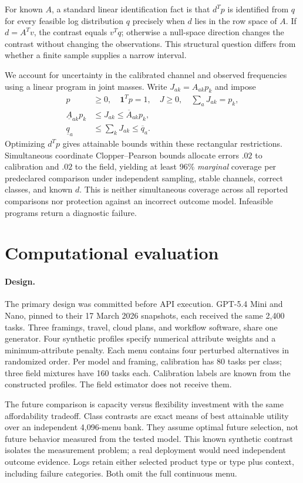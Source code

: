 \documentclass[sigconf,review,anonymous]{acmart}
\begin{document}
For known $A$, a standard linear identification fact is that $d^Tp$ is identified from $q$ for every feasible log distribution $q$ precisely when $d$ lies in the row space of $A$. If $d=A^Tv$, the contrast equals $v^Tq$; otherwise a null-space direction changes the contrast without changing the observations. This structural question differs from whether a finite sample supplies a narrow interval.

We account for uncertainty in the calibrated channel and observed frequencies using a linear program in joint masses. Write $J_{ak}=A_{ak}p_k$ and impose
\[
\begin{aligned}
p&\geq0,\quad \mathbf1^Tp=1,\quad J\geq0,\quad \sum_aJ_{ak}=p_k,\\
\underline A_{ak}p_k&\leq J_{ak}\leq\overline A_{ak}p_k,\\
\underline q_a&\leq\sum_kJ_{ak}\leq\overline q_a.
\end{aligned}
\] Optimizing $d^Tp$ gives attainable bounds within these rectangular restrictions. Simultaneous coordinate Clopper--Pearson bounds allocate errors $.02$ to calibration and $.02$ to the field, yielding at least 96\% \emph{marginal} coverage per predeclared comparison under independent sampling, stable channels, correct classes, and known $d$. This is neither simultaneous coverage across all reported comparisons nor protection against an incorrect outcome model. Infeasible programs return a diagnostic failure.

\section{Computational evaluation}
\paragraph{Design.}
The primary design was committed before API execution. GPT-5.4 Mini and Nano, pinned to their 17 March 2026 snapshots, each received the same 2,400 tasks. Three framings, travel, cloud plans, and workflow software, share one generator. Four synthetic profiles specify numerical attribute weights and a minimum-attribute penalty. Each menu contains four perturbed alternatives in randomized order. Per model and framing, calibration has 80 tasks per class; three field mixtures have 160 tasks each. Calibration labels are known from the constructed profiles. The field estimator does not receive them.

The future comparison is capacity versus flexibility investment with the same affordability tradeoff. Class contrasts are exact means of best attainable utility over an independent 4,096-menu bank. They assume optimal future selection, not future behavior measured from the tested model. This known synthetic contrast isolates the measurement problem; a real deployment would need independent outcome evidence. Logs retain either selected product type or type plus context, including failure categories. Both omit the full continuous menu.
\end{document}
